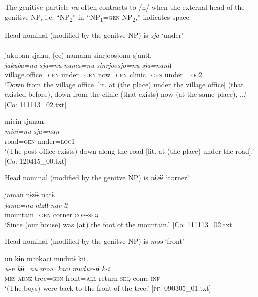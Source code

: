   The genitive particle \textit{nu} often contracts to /n/ when the external head of the genitive NP, i.e. “NP\textsubscript{2}” in “NP\textsubscript{1}=\textsc{gen} NP\textsubscript{2},” indicates space.

\ea\label{ex:6-81}
 Head nominal (modified by the genitve NP) is \textit{sja} ‘under’\\

 \ea{}\\
{\TM}
\glll  jakuban  sjanu,  (ee)  namanu  {\textbar}sinrjoosjo{\textbar}nu    sjantɨ,\\
\textit{jakuba=nu}  \textit{sja=nu}    \textit{nama=nu}  \textit{sinrjoosjo=nu}    \textit{sja=nantɨ}\\
village.office=\textsc{gen}  under=\textsc{gen}    now=\textsc{gen}  clinic=\textsc{gen}    under=\textsc{loc2}\\
\glt ‘Down from the village office [lit. at (the place) under the village office] (that existed before), down from the clinic (that exists) now (at the same place), ...’ [Co: 111113\_02.txt]

\ex
{\TM}
\glll micin  sjanan.\\
\textit{mici=nu}  \textit{sja=nan}\\
road=\textsc{gen}  under=\textsc{loc1}\\
\glt ‘(The post office exists) down along the road [lit. at (the place) under the road].’ [Co: 120415\_00.txt]

  Head nominal (modified by the genitve NP) is \textit{nɨzɨɨ} ‘corner’

\ex
{\TM}
\glll jaman  nɨzɨɨ  natɨ.\\
\textit{jama=nu}  \textit{nɨzɨɨ}  \textit{nar-tɨ}\\
mountain=\textsc{gen}  corner  \textsc{cop}-\textsc{seq}\\
\glt ‘Since (our house) was (at) the foot of the mountain.’ [Co: 111113\_02.txt]

  Head nominal (modified by the genitve NP) is \textit{məə} ‘front’

\ex
{\TM}
\glll  un  kɨn  məəkaci  mudutɨ  kii.\\
\textit{u-n}  \textit{kɨɨ=nu}  \textit{məə=kaci}  \textit{mudur-tɨ}  \textit{k-i}\\
\textsc{mes}-\textsc{adnz}  tree=\textsc{gen}  front=\textsc{all}  return-\textsc{seq}  come-\textsc{inf}\\
\glt ‘(The boys) were back to the front of the tree.’ [\textsc{pf}: 090305\_01.txt]

